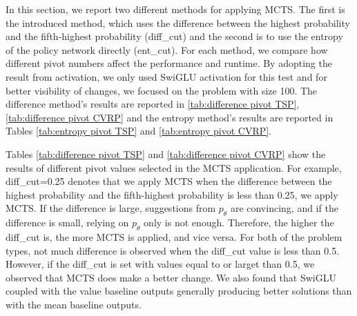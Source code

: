 \documentclass{article}
\begin{document}
In this section, we report two different methods for applying MCTS. The first is the introduced method, which uses the difference between the highest probability and the fifth-highest probability (diff\_cut) and the second is to use the entropy of the policy network directly (ent\_cut). For each method, we compare how different pivot numbers affect the performance and runtime. By adopting the result from activation, we only used SwiGLU activation for this test and for better visibility of changes, we focused on the problem with size 100. The difference method's results are reported in \ref{tab:difference pivot TSP},\ref{tab:difference pivot CVRP} and the entropy method's results are reported in Tables \ref{tab:entropy pivot TSP} and  \ref{tab:entropy pivot CVRP}.

Tables \ref{tab:difference pivot TSP} and \ref{tab:difference pivot CVRP} show the results of different pivot values selected in the MCTS application. For example, diff\_cut=0.25 denotes that we apply MCTS when the difference between the highest probability and the fifth-highest probability is less than 0.25, we apply MCTS. If the difference is large, suggestions from $p_\theta$ are convincing, and if the difference is small, relying on $p_\theta$ only is not enough. Therefore, the higher the diff\_cut is, the more MCTS is applied, and vice versa. For both of the problem types, not much difference is observed when the diff\_cut value is less than 0.5. However, if the diff\_cut is set with  values equal to or larget than 0.5, we observed that MCTS does make a better change. We also found that SwiGLU coupled with the value baseline outputs generally producing better solutions than with the mean baseline outputs.
\end{document}
